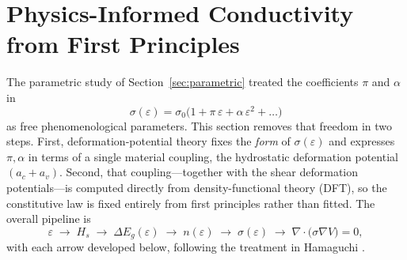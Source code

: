 %
%
%
%


\section{Physics-Informed Conductivity from First Principles}
\label{sec:physics-informed}

The parametric study of Section~\ref{sec:parametric}%
treated the coefficients $\pi$ and $\alpha$ in
\begin{equation}
  \sigma(\varepsilon) = \sigma_0\big(1 + \pi\,\varepsilon + \alpha\,\varepsilon^2 + \dots\big)
  \label{eq:sigma-taylor}
\end{equation}
as free phenomenological parameters. This section removes that freedom in two
steps. First, deformation-potential theory fixes the \emph{form} of
$\sigma(\varepsilon)$ and expresses $\pi,\alpha$ in terms of a single material
coupling, the hydrostatic deformation potential $(a_c+a_v)$. Second, that
coupling---together with the shear deformation potentials---is computed directly
from density-functional theory (DFT), so the constitutive law is fixed entirely
from first principles rather than fitted. The overall pipeline is
\begin{equation}
  \varepsilon \;\longrightarrow\; H_s \;\longrightarrow\; \Delta E_g(\varepsilon)
  \;\longrightarrow\; n(\varepsilon) \;\longrightarrow\; \sigma(\varepsilon)
  \;\longrightarrow\; \nabla\!\cdot\!\big(\sigma\nabla V\big)=0 ,
  \label{eq:pipeline}
\end{equation}
with each arrow developed below, following the treatment in Hamaguchi
\cite{hamaguchi}.
